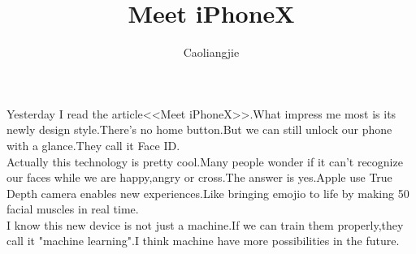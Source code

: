 \documentclass{ctexart}
\begin{document}
\title{Meet iPhoneX}
\author{Caoliangjie}
\maketitle
Yesterday I read the article<<Meet iPhoneX>>.What impress me most is its newly design style.There's no home button.But we can still unlock our phone with a glance.They call it Face ID.\\
  Actually this technology is pretty cool.Many people wonder if it can't recognize our faces while we are happy,angry or cross.The answer is yes.Apple use True Depth camera enables new experiences.Like bringing emojio to life by making 50 facial muscles in real time.\\
  I know this new device is not just a machine.If we can train them properly,they call it "machine learning".I think machine have more possibilities in the future.
\end{document}
